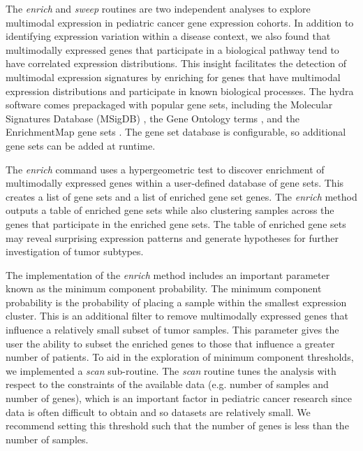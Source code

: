 \documentclass[10pt,letterpaper]{article}
\begin{document}
The \textit{enrich} and \textit{sweep} routines are two independent analyses to explore multimodal expression in pediatric cancer gene expression cohorts. In addition to identifying expression variation within a disease context, we also found that multimodally expressed genes that participate in a biological pathway tend to have correlated expression distributions. This insight facilitates the detection of multimodal expression signatures by enriching for genes that have multimodal expression distributions and participate in known biological processes. The hydra software comes prepackaged with popular gene sets, including the Molecular Signatures Database (MSigDB) \cite{liberzonMolecularSignaturesDatabase2011}, the Gene Ontology terms \cite{Ashburner2000, gene2018gene}, and the EnrichmentMap gene sets \cite{merico2010enrichment}. The gene set database is configurable, so additional gene sets can be added at runtime.

The \textit{enrich} command uses a hypergeometric test \cite{yuClusterProfilerPackageComparing2012} to discover enrichment of multimodally expressed genes within a user-defined database of gene sets. This creates a list of gene sets and a list of enriched gene set genes. The \textit{enrich} method outputs a table of enriched gene sets while also clustering samples across the genes that participate in the enriched gene sets. The table of enriched gene sets may reveal surprising expression patterns and generate hypotheses for further investigation of tumor subtypes. 

The implementation of the \textit{enrich} method includes an important parameter known as the minimum component probability. The minimum component probability is the probability of placing a sample within the smallest expression cluster. This is an additional filter to remove multimodally expressed genes that influence a relatively small subset of tumor samples. This parameter gives the user the ability to subset the enriched genes to those that influence a greater number of patients. To aid in the exploration of minimum component thresholds, we implemented a \textit{scan} sub-routine. The \textit{scan} routine tunes the analysis with respect to the constraints of the available data (e.g. number of samples and number of genes), which is an important factor in pediatric cancer research since data is often difficult to obtain and so datasets are relatively small. We recommend setting this threshold such that the number of genes is less than the number of samples. 
\end{document}
